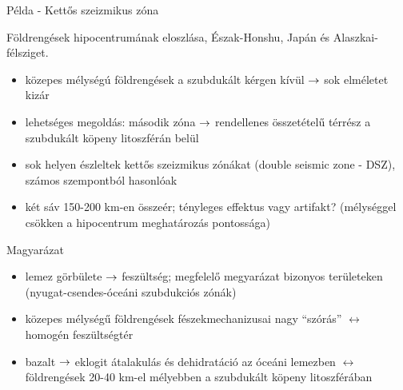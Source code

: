 \documentclass{beamer}
\begin{document}
\begin{frame}{Példa - Kettős szeizmikus zóna}
    \begin{minipage}[c]{0.45\textwidth}
        
        Földrengések hipocentrumának eloszlása, Észak-Honshu, Japán és Alaszkai-félsziget.
    \end{minipage}
    \hspace{5pt}
    \begin{minipage}[c]{0.45\textwidth}
        \begin{itemize}
            \item közepes mélységú földrengések a szubdukált kérgen kívül $\rightarrow$ sok elméletet kizár
            \item lehetséges megoldás: második zóna $\rightarrow$ rendellenes összetételű térrész a szubdukált köpeny litoszférán belül
            \item sok helyen észleltek kettős szeizmikus zónákat (double seismic zone - DSZ), számos szempontból hasonlóak
            \item két sáv 150-200 km-en összeér; tényleges effektus vagy artifakt? (mélységgel csökken a hipocentrum meghatározás pontossága)
        \end{itemize}
    \end{minipage}
\end{frame}


\begin{frame}{Magyarázat}
    \begin{itemize}
        \item lemez görbülete $\rightarrow$ feszültség; megfelelő megyarázat bizonyos területeken (nyugat-csendes-óceáni szubdukciós zónák)
        \item közepes mélységű földrengések fészekmechanizusai nagy ``szórás'' $\leftrightarrow$ homogén feszültségtér
        \item bazalt $\rightarrow$ eklogit átalakulás és dehidratáció az óceáni lemezben $\leftrightarrow$ földrengések 20-40 km-el mélyebben a szubdukált köpeny litoszférában
    \end{itemize}
\end{frame}
\end{document}

